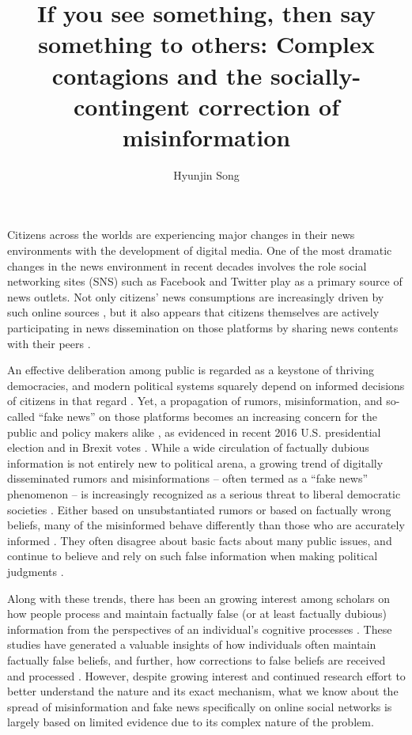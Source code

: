 \documentclass[man, 12pt, a4paper, noextraspace]{apa6}
\title{If you see something, then say something to others: Complex contagions and the socially-contingent correction of misinformation}
\author{\addvspace{.25in} Hyunjin Song}
\affiliation{Department of Communication, University of Vienna, Austria}
\begin{document}
\setcounter{page}{0}
\maketitle
  Citizens across the worlds are experiencing major changes in their news environments with the development of digital media. One of the most dramatic changes in the news environment in recent decades involves the role social networking sites (SNS) such as Facebook and Twitter play as a primary source of news outlets. Not only citizens' news consumptions are increasingly driven by such online sources \parencite{shearer2017news}, but it also appears that citizens themselves are actively participating in news dissemination on those platforms by sharing news contents with their peers \parencite[e.g.,][]{shearer2017news, lee2017people}. 

  An effective deliberation among public is regarded as a keystone of thriving democracies, and modern political systems squarely depend  on  informed  decisions of citizens in that regard \parencite{carpini1996}. Yet, a propagation of rumors, misinformation, and so-called \enquote{fake news} on those platforms becomes an increasing concern for the public and policy makers alike \parencite{allcott2017social, lazer2017combating}, as evidenced in recent 2016 U.S. presidential election \parencite{guess2018selective, giglietto2016fakes, allcott2017social} and in Brexit votes \parencite{nyt_2017}. While a wide circulation of factually dubious information is not entirely new to political arena, a growing trend of digitally disseminated rumors and misinformations -- often termed as a \enquote{fake news} phenomenon -- is increasingly recognized as a serious threat to liberal democratic societies \parencite{allcott2017social, lazer2017combating}. Either based on unsubstantiated rumors or based on factually wrong beliefs, many of the misinformed behave differently than those who are accurately informed \parencite{kuklinski2000misinformation}. They often disagree about basic facts about many public issues, and continue to believe and rely on such false information when making political judgments \parencite{nyhan2010corrections,thorson_2016}. 

  Along with these trends, there has been an growing interest among scholars on how people process and maintain factually false (or at least factually dubious) information from the perspectives of an individual's cognitive processes \parencite{Lewandowsky_2012PSPI, kuklinski2000misinformation, weeks2015emotions}. These studies have generated a valuable insights of how individuals often maintain factually false beliefs, and further, how corrections to false beliefs are received and processed \parencite{Lewandowsky_2012PSPI, thorson_2016, garrett2016driving}. However, despite growing interest and continued research effort to better understand the nature and its exact mechanism, what we know about the spread of misinformation and fake news specifically on online social networks is largely based on limited evidence due to its complex nature of the problem.
\end{document}
